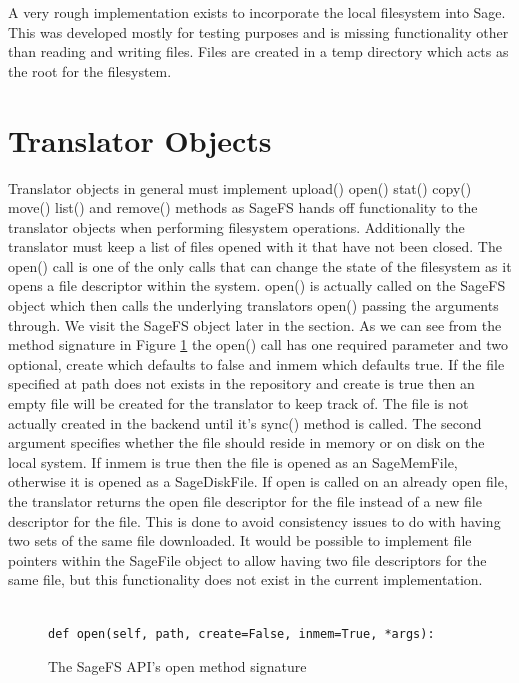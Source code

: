 A very rough implementation exists to incorporate the local filesystem into
Sage. This was developed mostly for testing purposes and is missing
functionality other than reading and writing files. Files are created in a
temp directory which acts as the root for the filesystem.


\section{Translator Objects}

Translator objects in general must implement upload() open() stat() copy()
move() list() and remove() methods as SageFS hands off functionality to the
translator objects when performing filesystem operations. Additionally the
translator must keep a list of files opened with it that have not been closed.
The open() call is one of the only calls that can change the state of the
filesystem as it opens a file descriptor within the system. open() is actually
called on the SageFS object which then calls the underlying translators open()
passing the arguments through. We visit the SageFS object later in the
section. As we can see from the method signature in Figure \ref{fig:sagefsopen}
the open() call has one required parameter and two optional, create which
defaults to false and inmem which defaults true. If the file specified at path
does not exists in the repository and create is true then an empty file will
be created for the translator to keep track of. The file is not actually
created in the backend until it's sync() method is called. The second argument
specifies whether the file should reside in memory or on disk on the local
system. If inmem is true then the file is opened as an SageMemFile, otherwise
it is opened as a SageDiskFile. If open is called on an already open file, the
translator returns the open file descriptor for the file instead of a new file
descriptor for the file. This is done to avoid consistency issues to do with
having two sets of the same file downloaded. It would be possible to implement
file pointers within the SageFile object to allow having two file descriptors
for the same file, but this functionality does not exist in the current
implementation.


\begin{figure}[h]
\begin{lstlisting}

def open(self, path, create=False, inmem=True, *args):

\end{lstlisting}
\caption{The SageFS API's open method signature}
\label{fig:sagefsopen}
\end{figure}

